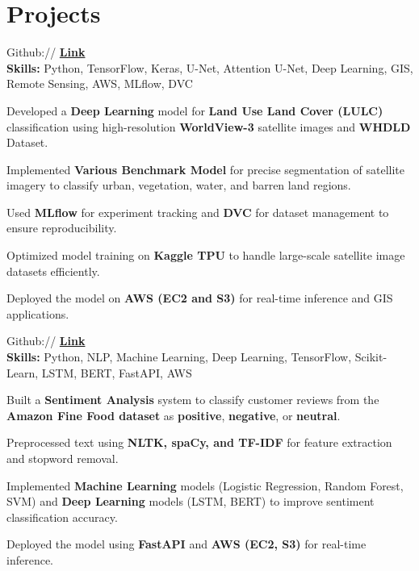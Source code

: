 \documentclass[]{deedy-resume-reversed}
\begin{document}
\begin{minipage}[t]{0.60\textwidth}
\section{Projects}
Github:// \href{https://github.com/rajesh0305/MSFCN-MASTER}{\bf Link} \\
\textbf{Skills:} Python, TensorFlow, Keras, U-Net, Attention U-Net, Deep Learning, GIS, Remote Sensing, AWS, MLflow, DVC  
\begin{tightemize}
    \item Developed a \textbf{Deep Learning} model for \textbf{Land Use Land Cover (LULC)} classification using high-resolution \textbf{WorldView-3} satellite images and \textbf{WHDLD} Dataset.
    \item Implemented \textbf{Various Benchmark Model} for precise segmentation of satellite imagery to classify urban, vegetation, water, and barren land regions.
    \item Used \textbf{MLflow} for experiment tracking and \textbf{DVC} for dataset management to ensure reproducibility.
    \item Optimized model training on \textbf{Kaggle TPU} to handle large-scale satellite image datasets efficiently.
    \item Deployed the model on \textbf{AWS (EC2 and S3)} for real-time inference and GIS applications.
\end{tightemize}

Github:// \href{https://github.com/rajesh0305/Amazon_Food_Reviews-main?tab=readme-ov-file}{\bf Link} \\
\textbf{Skills:} Python, NLP, Machine Learning, Deep Learning, TensorFlow, Scikit-Learn, LSTM, BERT, FastAPI, AWS    
\begin{tightemize}
    \item Built a \textbf{Sentiment Analysis} system to classify customer reviews from the \textbf{Amazon Fine Food dataset} as \textbf{positive}, \textbf{negative}, or \textbf{neutral}.
    \item Preprocessed text using \textbf{NLTK, spaCy, and TF-IDF} for feature extraction and stopword removal.
    \item Implemented \textbf{Machine Learning} models (Logistic Regression, Random Forest, SVM) and \textbf{Deep Learning} models (LSTM, BERT) to improve sentiment classification accuracy.
    \item Deployed the model using \textbf{FastAPI} and \textbf{AWS (EC2, S3)} for real-time inference.
\end{tightemize}

\end{minipage}
\end{document}

